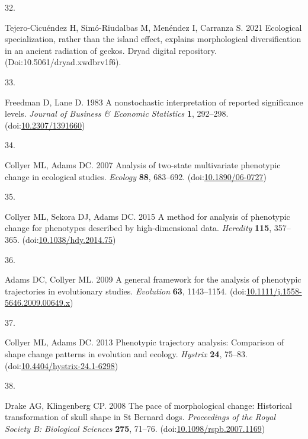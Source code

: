 \documentclass[
  11pt,
]{article}
\newlength{\cslhangindent}
\newlength{\csllabelwidth}
\newlength{\cslentryspacingunit} %
\newenvironment{CSLReferences}[2] %
 {%
  \setlength{\parindent}{0pt}
  \ifodd #1
  \let\oldpar\par
  \def\par{\hangindent=\cslhangindent\oldpar}
  \fi
  \setlength{\parskip}{#2\cslentryspacingunit}
 }%
 {}
\newcommand{\CSLLeftMargin}[1]{\parbox[t]{\csllabelwidth}{#1}}
\newcommand{\CSLRightInline}[1]{\parbox[t]{\linewidth - \csllabelwidth}{#1}\break}
\providecommand{\DIFaddbegin}{} %
\providecommand{\DIFaddend}{} %
\providecommand{\DIFdelbegin}{} %
\providecommand{\DIFdelend}{} %
\newcommand{\DIFscaledelfig}{0.5}
\newlength{\DIFdelgraphicswidth} %
\newlength{\DIFdelgraphicsheight} %
\newcommand{\DIFaddincludegraphics}[2][]{{\color{blue}\fbox{\DIFOincludegraphics[#1]{#2}}}} %
\newcommand{\DIFdelincludegraphics}[2][]{%
\sbox{\DIFdelgraphicsbox}{\DIFOincludegraphics[#1]{#2}}%
\settoboxwidth{\DIFdelgraphicswidth}{\DIFdelgraphicsbox} %
\settoboxtotalheight{\DIFdelgraphicsheight}{\DIFdelgraphicsbox} %
\scalebox{\DIFscaledelfig}{%
\parbox[b]{\DIFdelgraphicswidth}{\usebox{\DIFdelgraphicsbox}\\[-\baselineskip] \rule{\DIFdelgraphicswidth}{0em}}\llap{\resizebox{\DIFdelgraphicswidth}{\DIFdelgraphicsheight}{%
\setlength{\unitlength}{\DIFdelgraphicswidth}%
\begin{picture}(1,1)%
\thicklines\linethickness{2pt} %
{\color[rgb]{1,0,0}\put(0,0){\framebox(1,1){}}}%
{\color[rgb]{1,0,0}\put(0,0){\line( 1,1){1}}}%
{\color[rgb]{1,0,0}\put(0,1){\line(1,-1){1}}}%
\end{picture}%
}\hspace*{3pt}}} %
} %
\DeclareRobustCommand{\DIFaddbegin}{\DIFOaddbegin \let\includegraphics\DIFaddincludegraphics} %
\DeclareRobustCommand{\DIFaddend}{\DIFOaddend \let\includegraphics\DIFOincludegraphics} %
\DeclareRobustCommand{\DIFdelbegin}{\DIFOdelbegin \let\includegraphics\DIFdelincludegraphics} %
\DeclareRobustCommand{\DIFdelend}{\DIFOaddend \let\includegraphics\DIFOincludegraphics} %
\begin{document}
\begin{CSLReferences}{0}{0}
\leavevmode{}%
\CSLLeftMargin{32. }%
\CSLRightInline{Tejero-Cicuéndez H, Simó-Riudalbas M, Menéndez I,
Carranza S. 2021 Ecological specialization, rather than the island
effect, explains morphological diversification in an ancient radiation
of geckos. Dryad digital repository. (Doi:10.5061/dryad.xwdbrv1f6). }

\leavevmode{}%
\CSLLeftMargin{33. }%
\CSLRightInline{Freedman D, Lane D. 1983 A nonstochastic interpretation
of reported significance levels. \emph{Journal of Business {\&} Economic
Statistics} \textbf{1}, 292--298.
(doi:\href{https://doi.org/10.2307/1391660}{10.2307/1391660})}

\leavevmode{}%
\CSLLeftMargin{34. }%
\CSLRightInline{Collyer ML, Adams DC. 2007 Analysis of two-state
multivariate phenotypic change in ecological studies. \emph{Ecology}
\textbf{88}, 683--692.
(doi:\href{https://doi.org/10.1890/06-0727}{10.1890/06-0727})}

\leavevmode{}%
\CSLLeftMargin{35. }%
\CSLRightInline{Collyer ML, Sekora DJ, Adams DC. 2015 A method for
analysis of phenotypic change for phenotypes described by
high-dimensional data. \emph{Heredity} \textbf{115}, 357--365.
(doi:\href{https://doi.org/10.1038/hdy.2014.75}{10.1038/hdy.2014.75})}

\leavevmode{}%
\CSLLeftMargin{36. }%
\CSLRightInline{Adams DC, Collyer ML. 2009 A general framework for the
analysis of phenotypic trajectories in evolutionary studies.
\emph{Evolution} \textbf{63}, 1143--1154.
(doi:\href{https://doi.org/10.1111/j.1558-5646.2009.00649.x}{10.1111/j.1558-5646.2009.00649.x})}

\leavevmode{}%
\CSLLeftMargin{37. }%
\CSLRightInline{Collyer ML, Adams DC. 2013 Phenotypic trajectory
analysis: Comparison of shape change patterns in evolution and ecology.
\emph{Hystrix} \textbf{24}, 75--83.
(doi:\href{https://doi.org/10.4404/hystrix-24.1-6298}{10.4404/hystrix-24.1-6298})}

\leavevmode{}%
\CSLLeftMargin{38. }%
\DIFdelbegin %
\DIFdelend \DIFaddbegin \CSLRightInline{Drake AG, Klingenberg CP. 2008 The pace of morphological
change: Historical transformation of skull shape in {S}t {B}ernard dogs.
\emph{Proceedings of the Royal Society B: Biological Sciences}
\textbf{275}, 71--76.
(doi:\href{https://doi.org/10.1098/rspb.2007.1169}{10.1098/rspb.2007.1169})}
\DIFaddend 


\end{CSLReferences}
\end{document}
